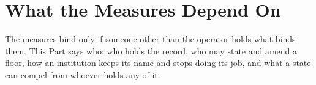 \part{What the Measures Depend On}

The measures bind only if someone other than the operator holds what binds them. This Part says who: who holds the record, who may state and amend a floor, how an institution keeps its name and stops doing its job, and what a state can compel from whoever holds any of it.
